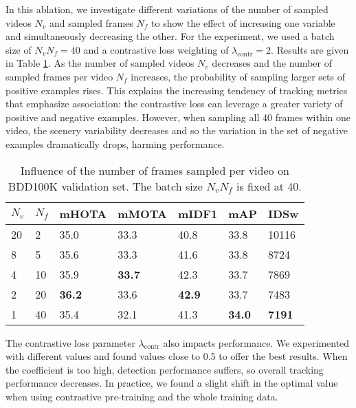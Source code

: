  In this ablation, we investigate different variations of the number of sampled videos $N_v$ and sampled frames $N_f$ to show the effect of increasing one variable and simultaneously decreasing the other. For the experiment, we used a batch size of $N_vN_f=40$ and a contrastive loss weighting of $\lambda_{\mathrm{contr}} = 2$. Results are given in Table \ref{tab:samples-variation}. As the number of sampled videos $N_v$ decreases and the number of sampled frames per video $N_f$ increases, the probability of sampling larger sets of positive examples rises. This explains the increasing tendency of tracking metrics that emphasize association: the contrastive loss can leverage a greater variety of positive and negative examples. 
However, when sampling all 40 frames within one video, the scenery variability decreases and so the variation in the set of negative examples dramatically drops, harming performance.

\begin{table}[h!]
\centering \footnotesize
\begin{tabular}{lllllll}
\toprule
$N_v$ & $N_f$ & mHOTA & mMOTA & mIDF1 & mAP & IDSw \\
\midrule
20 & 2  & 35.0     & 33.3     & 40.8     & 33.8     & 10116     \\
8  & 5  & 35.6     & 33.3     & 41.6     & 33.8     & 8724     \\
4  & 10 & 35.9     & \textbf{33.7}     & 42.3     & 33.7     & 7869     \\
2  & 20 & \textbf{36.2}     & 33.6     & \textbf{42.9}     & 33.7     & 7483     \\
1  & 40 & 35.4     & 32.1     & 41.3     & \textbf{34.0}     & \textbf{7191}     \\
\bottomrule
\end{tabular}
\caption{Influence of the number of frames sampled per video on BDD100K validation set. The batch size $N_v N_f$ is fixed at 40.}
\label{tab:samples-variation}
\vspace{-1em}
\end{table}

The contrastive loss parameter $\lambda_{\mathrm{contr}}$ also impacts performance. We experimented with different values and found values close to 0.5 to offer the best results. When the coefficient is too high, detection performance suffers, so overall tracking performance decreases.
In practice, we found a slight shift in the optimal value when using contrastive pre-training and the whole training data.

